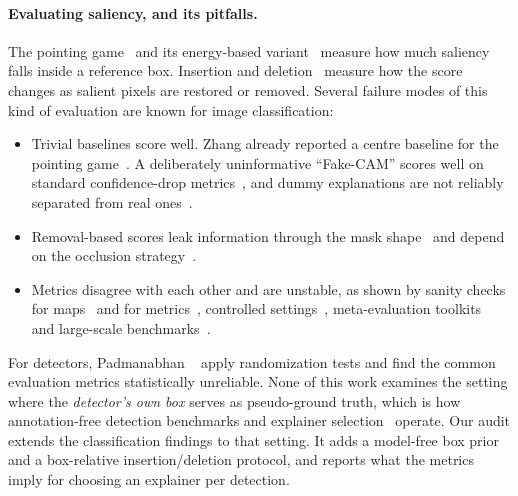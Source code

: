 \paragraph{Evaluating saliency, and its pitfalls.}
The pointing game~\cite{zhang2016excitation} and its energy-based
variant~\cite{wang2020scorecam} measure how much saliency falls inside a
reference box. Insertion and deletion~\cite{petsiuk2018rise} measure how the
score changes as salient pixels are restored or removed.
Several failure modes of this kind of evaluation are known for image
classification:
\begin{itemize}
  \item Trivial baselines score well. Zhang \etal already reported a centre
  baseline for the pointing game~\cite{zhang2016excitation}. A deliberately
  uninformative ``Fake-CAM'' scores well on standard confidence-drop
  metrics~\cite{poppi2021revisiting}, and dummy explanations are not reliably
  separated from real ones~\cite{stassin2023dummy}.
  \item Removal-based scores leak information through the mask
  shape~\cite{hooker2019roar,rong2022road} and depend on the occlusion
  strategy~\cite{bluecher2024occlusion}.
  \item Metrics disagree with each other and are unstable, as shown by sanity
  checks for maps~\cite{adebayo2018sanity} and for
  metrics~\cite{tomsett2020sanity}, controlled
  settings~\cite{rao2022attribution}, meta-evaluation
  toolkits~\cite{hedstrom2023quantus,hedstrom2023metaquantus} and large-scale
  benchmarks~\cite{klein2024latec}.
\end{itemize}
For detectors, Padmanabhan \etal~\cite{padmanabhan2023sanity} apply
randomization tests and find the common evaluation metrics statistically
unreliable. None of this work examines the setting where the \emph{detector's
own box} serves as pseudo-ground truth, which is how annotation-free
detection benchmarks and explainer
selection~\cite{nguyen2025odexai,cugny2022autoxai} operate.
Our audit extends the classification findings to that setting. It adds a
model-free box prior and a box-relative insertion/deletion protocol, and
reports what the metrics imply for choosing an explainer per detection.

